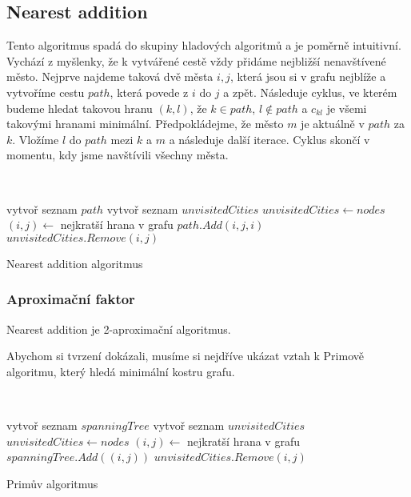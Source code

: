 \documentclass[
  biblatex,
  figures=false,
  glossaries,
  index
]{kidiplom}
\begin{document}
\subsection{Nearest addition}
	Tento algoritmus spadá do skupiny hladových algoritmů a je poměrně intuitivní. Vychází z myšlenky, že k vytvářené cestě vždy přidáme nejbližší nenavštívené město. Nejprve najdeme taková dvě města $i, j$, která jsou si v grafu nejblíže a vytvoříme cestu $path$, která povede z $i$ do $j$ a zpět. Následuje cyklus, ve kterém budeme hledat takovou hranu $(k, l)$, že $k \in path$, $l \notin path$ a $c_{kl}$ je všemi takovými hranami minimální. Předpokládejme, že město $m$ je aktuálně v $path$ za $k$. Vložíme $l$ do $path$ mezi $k$ a $m$ a následuje další iterace. Cyklus skončí v momentu, kdy jsme navštívili všechny města.\newline
	
{\SetAlgoNoLine\
\begin{algorithm}[H]
vytvoř seznam $path$\;
vytvoř seznam $unvisitedCities$\;
$unvisitedCities \leftarrow nodes$\;
$(i, j) \leftarrow $ nejkratší hrana v grafu\;
$path.Add(i, j, i)$\;
$unvisitedCities.Remove(i, j)$\;

\caption{Nearest addition algoritmus}
\end{algorithm}}

\subsubsection{Aproximační faktor}
\begin{theorem}
Nearest addition  je 2-aproximační algoritmus.
\end{theorem}

Abychom si tvrzení dokázali, musíme si nejdříve ukázat vztah k Primově algoritmu, který hledá minimální kostru grafu.\newline

{\SetAlgoNoLine\
\begin{algorithm}[H]
vytvoř seznam $spanningTree$\;
vytvoř seznam $unvisitedCities$\;
$unvisitedCities \leftarrow nodes$\;
$(i, j) \leftarrow $ nejkratší hrana v grafu\;
$spanningTree.Add((i, j))$\;
$unvisitedCities.Remove(i, j)$\;

\caption{Primův algoritmus}
\end{algorithm}}\leavevmode\newline
\end{document}
